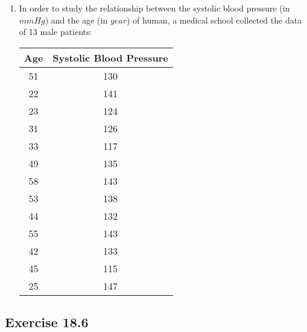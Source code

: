 \documentclass{report}
\begin{document}
\begin{multicols}{2}
\begin{enumerate}
    \item In order to study the relationship between the systolic blood pressure (in
          $\mathit{mmHg}$) and the age (in $year$) of human, a medical school collected
          the data of 13 male patients:
          \begin{center}
            \begin{tabular}{|c|c|}
              \hline
              Age & Systolic Blood Pressure \\
              \hline
              51  & 130                     \\
              22  & 141                     \\
              23  & 124                     \\
              31  & 126                     \\
              33  & 117                     \\
              49  & 135                     \\
              58  & 143                     \\
              53  & 138                     \\
              44  & 132                     \\
              55  & 143                     \\
              42  & 133                     \\
              45  & 115                     \\
              25  & 147                     \\
              \hline
            \end{tabular}
          \end{center}
  \end{enumerate}

  \subsection{Exercise 18.6}


\end{multicols}
\end{document}
